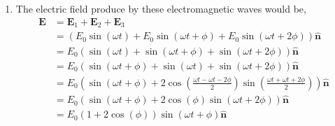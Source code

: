 \documentclass{article}
\theoremstyle{mytheoremstyle}
\theoremstyle{mytheoremstyle}
\theoremstyle{myproblemstyle}
\begin{document}
\begin{problem}[Intensity]
\begin{enumerate}
	\item The electric field produce by these electromagnetic waves would be,
	      \begin{align*}
		      \mathbf{E} & = \mathbf{E}_1+\mathbf{E}_2+\mathbf{E}_3                                                                                                                                     \\
		                 & = \left(E_0\sin{\left(\omega t\right)}+E_0\sin{\left(\omega t+\phi\right)}+E_0\sin{\left(\omega t+2\phi\right)}\right)\hat{\mathbf{n}}                                       \\
		                 & = E_0\left(\sin{\left(\omega t\right)}+\sin{\left(\omega t+\phi\right)}+\sin{\left(\omega t+2\phi\right)}\right)\hat{\mathbf{n}}                                             \\
		                 & = E_0\left(\sin{\left(\omega t+\phi\right)}+\sin{\left(\omega t\right)}+\sin{\left(\omega t+2\phi\right)}\right)\hat{\mathbf{n}}                                             \\
		                 & = E_0\left(\sin{\left(\omega t+\phi\right)}+2\cos{\left(\frac{\omega t-\omega t-2\phi}{2}\right)}\sin{\left(\frac{\omega t+\omega t+2\phi}{2}\right)}\right)\hat{\mathbf{n}} \\
		                 & = E_0\left(\sin{\left(\omega t+\phi\right)}+2\cos{\left(\phi\right)}\sin{\left(\omega t+2\phi\right)}\right)\hat{\mathbf{n}}                                                 \\
		                 & = E_0\left(1+2\cos{\left(\phi\right)}\right)\sin{\left(\omega t+\phi\right)}\hat{\mathbf{n}}
	      \end{align*}


\end{enumerate}
\end{problem}
\end{document}
